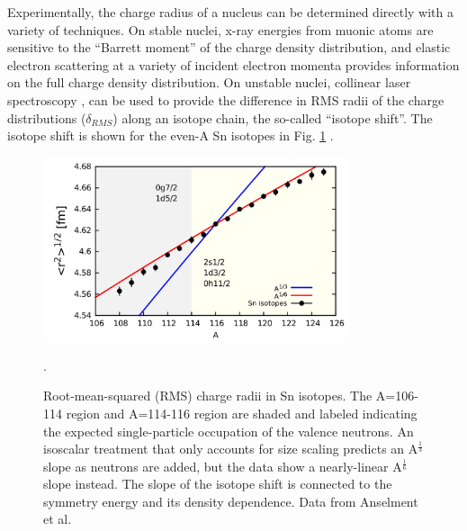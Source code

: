 Experimentally, the charge radius of a nucleus can be determined directly
with a variety of techniques. On stable nuclei, x-ray energies from muonic atoms
\cite{Fricke2004} are sensitive to the ``Barrett moment'' of the charge density
distribution, and elastic electron scattering \cite{DeVries1987} at a variety of
incident electron momenta provides information on the full charge density
distribution. On unstable nuclei, collinear laser spectroscopy \cite{Miller2019},
can be used to provide the difference in RMS radii of the charge distributions
($\delta_{RMS}$) along an isotope chain, the so-called ``isotope shift''.
The isotope shift is shown for the even-A Sn isotopes in Fig.
\ref{SnIsotopeShift} \cite{Anselment1986}.

\begin{figure}[tb]
    \centering
    \includegraphics[width=0.8\textwidth]{figures/SnIsotopeRMSRadii.png}
    \caption[Root-mean-squared charge radii of Sn isotopes]
    {
        Root-mean-squared (RMS) charge radii in Sn isotopes.
        The A=106-114 region and A=114-116 region are shaded and labeled
    indicating the expected single-particle occupation of the valence neutrons.
    An isoscalar treatment that only accounts for size scaling predicts an
    A$^{\frac{1}{3}}$ slope as neutrons are added, but the data show a nearly-linear
A$^{\frac{1}{6}}$ slope instead. The slope of the isotope shift is connected to the symmetry energy
and its density dependence. Data from Anselment et al. \cite{Anselment1986}}.
    \label{SnIsotopeShift}
\end{figure}

